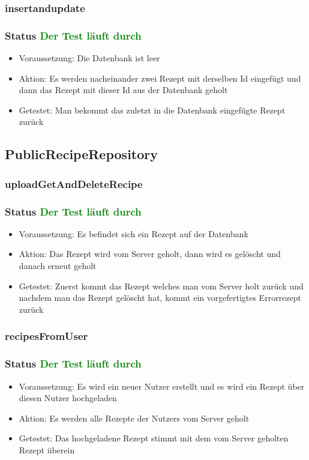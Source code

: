 \subsubsection{insertandupdate}
\subsubsection{Status \textcolor{green}{ Der Test läuft durch} }
\begin{itemize}
	\item Voraussetzung: Die Datenbank ist leer
	\item Aktion: Es werden nacheinander zwei Rezept mit derselben Id eingefügt und dann das Rezept mit dieser Id aus der Datenbank geholt
	\item Getestet: Man bekommt das zuletzt in die Datenbank eingefügte Rezept zurück
\end{itemize}

\subsection{PublicRecipeRepository}

\subsubsection{uploadGetAndDeleteRecipe}
\subsubsection{Status \textcolor{green}{ Der Test läuft durch} }
\begin{itemize}
	\item Voraussetzung: Es befindet sich ein Rezept auf der Datenbank
	\item Aktion: Das Rezept wird vom Server geholt, dann wird es gelöscht und danach erneut geholt
	\item Getestet: Zuerst kommt das Rezept welches man vom Server holt zurück und nachdem man das Rezept gelöscht hat, kommt ein vorgefertigtes Errorrezept zurück
\end{itemize}

\subsubsection{recipesFromUser}
\subsubsection{Status \textcolor{green}{ Der Test läuft durch} }
\begin{itemize}
	\item Voraussetzung: Es wird ein neuer Nutzer erstellt und es wird ein Rezept über diesen Nutzer hochgeladen
	\item Aktion: Es werden alle Rezepte der Nutzers vom Server geholt
	\item Getestet: Das hochgeladene Rezept stimmt mit dem vom Server geholten Rezept überein
\end{itemize}

